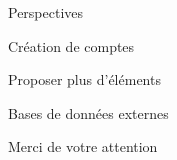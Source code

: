 \documentclass[11pt]{beamer}
\begin{document}
\begin{frame}{Perspectives}
\begin{block}{}
	\begin{center}
		Création de comptes
	\end{center}
\end{block}

\begin{block}{}
	\begin{center}
		Proposer plus d'éléments
	\end{center}
\end{block}

\begin{block}{}
	\begin{center}
		Bases de données externes
	\end{center}
\end{block}
\end{frame}

\begin{frame}{}
\begin{center}
Merci de votre attention
\end{center}
\end{frame}
\end{document}
